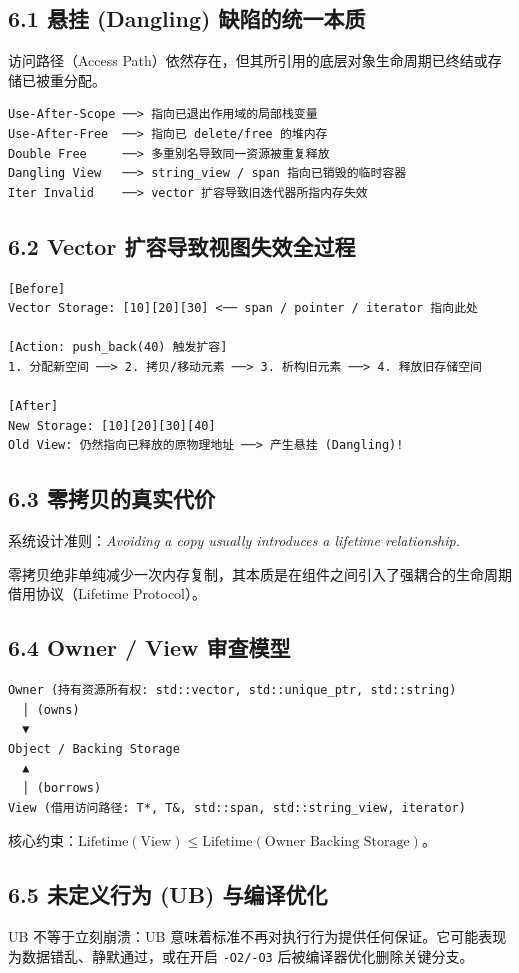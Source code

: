 \documentclass[11pt,a4paper]{article}
\begin{document}
\subsection{6.1 悬挂 (Dangling) 缺陷的统一本质}
访问路径（Access Path）依然存在，但其所引用的底层对象生命周期已终结或存储已被重分配。

\begin{lstlisting}[language=text]
Use-After-Scope ──> 指向已退出作用域的局部栈变量
Use-After-Free  ──> 指向已 delete/free 的堆内存
Double Free     ──> 多重别名导致同一资源被重复释放
Dangling View   ──> string_view / span 指向已销毁的临时容器
Iter Invalid    ──> vector 扩容导致旧迭代器所指内存失效
\end{lstlisting}
\subsection{6.2 Vector 扩容导致视图失效全过程}
\begin{lstlisting}[language=text]
[Before]
Vector Storage: [10][20][30] <── span / pointer / iterator 指向此处

[Action: push_back(40) 触发扩容]
1. 分配新空间 ──> 2. 拷贝/移动元素 ──> 3. 析构旧元素 ──> 4. 释放旧存储空间

[After]
New Storage: [10][20][30][40]
Old View: 仍然指向已释放的原物理地址 ──> 产生悬挂 (Dangling)!
\end{lstlisting}
\subsection{6.3 零拷贝的真实代价}
系统设计准则：\textit{Avoiding a copy usually introduces a lifetime relationship.}

零拷贝绝非单纯减少一次内存复制，其本质是在组件之间引入了强耦合的生命周期借用协议（Lifetime Protocol）。

\subsection{6.4 Owner / View 审查模型}
\begin{lstlisting}[language=text]
Owner (持有资源所有权: std::vector, std::unique_ptr, std::string)
  │ (owns)
  ▼
Object / Backing Storage
  ▲
  │ (borrows)
View (借用访问路径: T*, T&, std::span, std::string_view, iterator)
\end{lstlisting}
核心约束：$\text{Lifetime}(\text{View}) \le \text{Lifetime}(\text{Owner Backing Storage})$。

\subsection{6.5 未定义行为 (UB) 与编译优化}
UB 不等于立刻崩溃：UB 意味着标准不再对执行行为提供任何保证。它可能表现为数据错乱、静默通过，或在开启 \texttt{-O2/-O3} 后被编译器优化删除关键分支。
\end{document}
